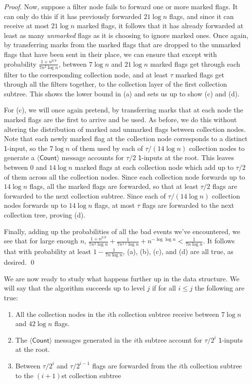 \documentclass[11pt,letter]{article}
\theoremstyle{mytheoremstyle}
\newcommand{\countm}{$\langle\mathsf{Count}\rangle$\xspace}
\newcommand{\oneinput}{$\mathsf{1}$-input\xspace}
\newcommand{\oneinputs}{$\mathsf{1}$-inputs\xspace}
\begin{document}
\begin{proof}
	Now, suppose a filter node fails to forward one or more marked flags. It can only do this if it has previously forwarded $21\log{n}$ flags, and since it can receive at most $21\log{n}$ marked flags, it follows that it has already forwarded at least as many
	\emph{unmarked} flags as it is choosing to ignore marked ones. Once again, by transferring marks from the marked flags that are dropped to the unmarked flags that have been sent in their place, we can ensure that except with probability $\frac{1+n^{0.9}}{7n^2\log{n}}$, between  $7\log{n}$ and $21\log{n}$ marked flags get through each filter to the corresponding collection node, and at least $\tau$ marked flags get through all the filters together, to the collection layer of the first collection subtree. This shows the lower bound in (a) and sets us up to show (c) and (d).
	
	For (c), we will once again pretend, by transferring marks that at each node the marked flags are the first to arrive and be used. As before, we do this without altering the distribution of marked and unmarked flags between collection nodes. Note that each newly marked flag at the collection node corresponds to a distinct
	\oneinput, so the $7\log{n}$ of them used by each of $\tau/(14\log{n})$ collection nodes to generate a \countm message accounts for $\tau/2$
	\oneinputs at the root. This leaves between $0$ and $14\log{n}$ marked flags at each collection node which add up to $\tau/2$ of them across all the collection nodes. Since each collection node forwards up to $14\log{n}$ flags, all the marked flags are forwarded, so that at least $\tau/2$ flags are forwarded to the next collection subtree. Since each of $\tau/(14\log{n})$ collection nodes forwards up to $14\log{n}$ flags, at most $\tau$ flags are forwarded to the next collection tree, proving (d).
	
	Finally, adding up the probabilities of all the bad events we've encountered, we see that for large enough $n$, $\frac{1+n^{0.9}}{7n^2\log{n}}
	+ \frac1{7n^{1.1}\log{n}}+ n^{-\log\log{n}} < \frac1{7n\log{n}}$.
	It follows that with probability at least $1-\frac1{7n\log{n}}$, (a), (b), (c), and (d) are all true, as desired.
	\qed
\end{proof}

We are now ready to study what happens further up in the data structure.
We will say that the algorithm succeeds up to level $j$ if for all $i \le j$ the following are true:
\begin{enumerate}
	\item All the collection nodes in the $i$th collection subtree receive between $7\log{n}$ and $42\log{n}$ flags.
	\item The \countm messages generated in the $i$th subtree account for $\tau/2^i$ \oneinputs at the root.
	\item Between $\tau/2^i$ and $\tau/2^{i-1}$ flags are forwarded from the $i$th collection subtree to the $(i+1)$st collection subtree
\end{enumerate}
\end{document}
